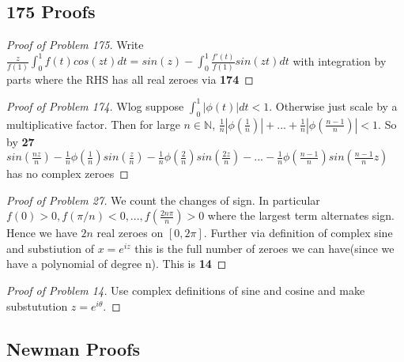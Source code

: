 \documentclass[10pt]{article}
\newcommand{\1}{\textbf{1}}
\newcommand{\N}{\mathbb{N}}
\theoremstyle{remark}
\theoremstyle{definition}
\begin{document}
\subsection{175 Proofs}

\begin{proof}[Proof of Problem 175]
	Write $\frac{z}{f(1)} \int_0^1 f(t)cos(zt)dt = sin(z) - \int_0^1 \frac{f'(t)}{f(1)}sin(zt) dt$ with integration by parts where the RHS has all real zeroes via \textbf{174}
\end{proof}

\begin{proof}[Proof of Problem 174]
	Wlog suppose $\int_0^1 |\phi(t)| dt < 1$. Otherwise just scale by a multiplicative factor. Then for large $n \in \N$, $\frac{1}{n}|\phi(\frac{1}{n})| + ... + \frac{1}{n} |\phi(\frac{n-1}{n})| < 1$. So by \textbf{27} $sin(\frac{nz}{n}) - \frac{1}{n}\phi(\frac{1}{n}) sin(\frac{z}{n}) - \frac{1}{n}\phi(\frac{2}{n})sin(\frac{2 z}{n}) - ... - \frac{1}{n}\phi(\frac{n-1}{n})sin(\frac{n-1}{n}z)$ has no complex zeroes
\end{proof}

\begin{proof}[Proof of Problem 27]
	We count the changes of sign. In particular $f(0) > 0, f(\pi/n) < 0, ..., f(\frac{2 n \pi}{n}) > 0$ where the largest term alternates sign. Hence we have $2n$ real zeroes on $[0,2\pi]$. Further via definition of complex sine and substiution of $x = e^{iz}$ this is the full number of zeroes we can have(since we have a polynomial of degree n). This is \textbf{14}
\end{proof}

\begin{proof}[Proof of Problem 14]
	Use complex definitions of sine and cosine and make substutution $z=e^{i\theta}$.
\end{proof}

\subsection{Newman Proofs}
\end{document}
